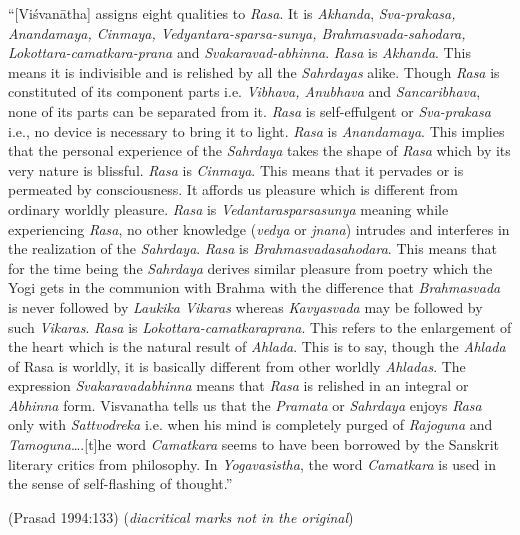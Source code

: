 \begin{myquote}
“[Viśvanātha] assigns eight qualities to \textsl{Rasa}. It is \textsl{Akhanda}, \textsl{Sva-prakasa, Anandamaya, Cinmaya, Vedyantara-sparsa-sunya, Brahmasvada-sahodara, Loko\-ttara-camatkara-prana} and \textsl{Svakaravad-abhinna}. \textsl{Rasa} is \textsl{Akhanda}. This means it is indivisible and is relished by all the \textsl{Sahrdayas} alike. Though \textsl{Rasa} is constituted of its component parts i.e. \textsl{Vibhava, Anubhava} and \textsl{Sancaribhava}, none of its parts can be separated from it. \textsl{Rasa} is self-effulgent or \textsl{Sva-prakasa} i.e., no device is necessary to bring it to light. \textsl{Rasa} is \textsl{Anandamaya}. This implies that the personal experience of the \textsl{Sahrdaya} takes the shape of \textsl{Rasa} which by its very nature is blissful. \textsl{Rasa} is \textsl{Cinmaya}. This means that it pervades or is permeated by consciousness. It affords us pleasure which is different from ordinary worldly pleasure. \textsl{Rasa} is \textsl{Vedantarasparsasunya} meaning while experiencing \textsl{Rasa}, no other knowledge (\textsl{vedya} or \textsl{jnana}) intrudes and interferes in the realization of the \textsl{Sahrdaya}. \textsl{Rasa} is \textsl{Brahmasvadasahodara}. This means that for the time being the \textsl{Sahrdaya} derives similar pleasure from poetry which the Yogi gets in the communion with Brahma with the difference that \textsl{Brahmasvada} is never followed by \textsl{Laukika Vikaras} whereas \textsl{Kavyasvada} may be followed by such \textsl{Vikaras}. \textsl{Rasa} is \textsl{Lokottara-camatkaraprana}. This refers to the enlargement of the heart which is the natural result of \textsl{Ahlada}. This is to say, though the \textsl{Ahlada} of Rasa is worldly, it is basically different from other worldly \textsl{Ahladas}. The expression \textsl{Svakaravadabhinna} means that \textsl{Rasa} is relished in an integral or \textsl{Abhinna} form. Visvanatha tells us that the \textsl{Pramata} or \textsl{Sahrdaya} enjoys \textsl{Rasa} only with \textsl{Sattvodreka} i.e. when his mind is completely purged of \textsl{Rajoguna} and \textsl{Tamoguna}….[t]he word \textsl{Camatkara} seems to have been borrowed by the Sanskrit literary critics from philosophy. In \textsl{Yogavasistha}, the word \textsl{Camatkara} is used in the sense of self-flashing of thought.” 

\hfill (Prasad 1994:133) (\textsl{diacritical marks not in the original})
\end{myquote}

